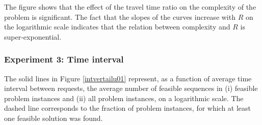 \documentclass[dissertation,draft*]{aaltoseries}
\begin{document}
The figure shows that the effect of the travel time ratio on the complexity of the problem is significant.
The fact that the slopes of the curves increase with $R$ on the logarithmic scale indicates that the relation 
between complexity and $R$ is super-exponential.






\subsubsection{Experiment 3: Time interval}
The solid lines in Figure \ref{intvertailu01} represent, as a function of average time interval 
between requests, the average number of feasible sequences in
(i) feasible problem instances and (ii) all problem instances, on a logarithmic scale.
The dashed line corresponds to the fraction
of problem instances, for which at least one feasible solution was found.

\end{document}
